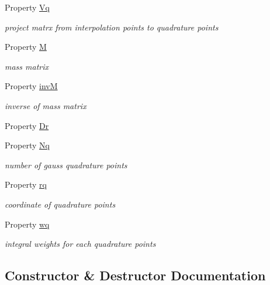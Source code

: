 \begin{DoxyCompactItemize}
Property \hyperlink{class_std_prism_tri_af8d7e4c3ab71b4ecec29dfc0d03801a3}{Vq}
\begin{DoxyCompactList}\small\item\em project matrx from interpolation points to quadrature points \end{DoxyCompactList}\item 
Property \hyperlink{class_std_prism_tri_a348c05c4207234381617a452cb14a0f3}{M}
\begin{DoxyCompactList}\small\item\em mass matrix \end{DoxyCompactList}\item 
Property \hyperlink{class_std_prism_tri_a4542d6911c6759f3ba78afe6161d01cd}{invM}
\begin{DoxyCompactList}\small\item\em inverse of mass matrix \end{DoxyCompactList}\item 
Property \hyperlink{class_std_prism_tri_a4f01172eb04ca20e829fef6d9b17a9a8}{Dr}
\item 
Property \hyperlink{class_std_prism_tri_a1ddd2676a7743d36002bc0f0b85f2ca0}{Nq}
\begin{DoxyCompactList}\small\item\em number of gauss quadrature points \end{DoxyCompactList}\item 
Property \hyperlink{class_std_prism_tri_a278061b68cc1edd442b98241cc68de7d}{rq}
\begin{DoxyCompactList}\small\item\em coordinate of quadrature points \end{DoxyCompactList}\item 
Property \hyperlink{class_std_prism_tri_ae765bd6d352ea95b5102310916a8978a}{wq}
\begin{DoxyCompactList}\small\item\em integral weights for each quadrature points \end{DoxyCompactList}\end{DoxyCompactItemize}


\subsection{Constructor \& Destructor Documentation}
\mbox{\label{class_std_prism_tri_abef1448e566aa46a77db6122ba6673ea}} 
